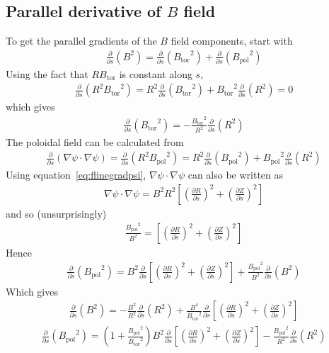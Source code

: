 \documentclass[12pt]{article}
\newcommand{\deriv}[2]{\ensuremath{\frac{\partial #1}{\partial #2}}}
\newcommand{\Bp}{\ensuremath{B_{\text{pol}}}}
\newcommand{\Bt}{\ensuremath{B_{\text{tor}}}}
\begin{document}
\subsection{Parallel derivative of $B$ field}
To get the parallel gradients of the $B$ field components, start with
%
\begin{align*}
\deriv{}{s}\left(B^2\right) = \deriv{}{s}\left(\Bt^2\right) +
\deriv{}{s}\left(\Bp^2\right)
\end{align*}
%
Using the fact that $R\Bt$ is constant along $s$,
%
\begin{align*}
\deriv{}{s}\left(R^2\Bt^2\right) = R^2\deriv{}{s}\left(\Bt^2\right) +
\Bt^2\deriv{}{s}\left(R^2\right) = 0
\end{align*}
%
which gives
%
\begin{align*}
  \deriv{}{s}\left(\Bt^2\right) = -\frac{\Bt^2}{R^2}\deriv{}{s}\left(R^2\right)
\end{align*}
%
The poloidal field can be calculated from
%
\begin{align*}
\deriv{}{s}\left(\nabla\psi \cdot \nabla\psi\right) =
\deriv{}{s}\left(R^2\Bp^2\right) = R^2\deriv{}{s}\left(\Bp^2\right) +
\Bp^2\deriv{}{s}\left(R^2\right)
\end{align*}
%
Using equation~\ref{eq:flinegradpsi}, $\nabla\psi \cdot \nabla\psi$ can also be
written as
%
\begin{align*}
\nabla\psi \cdot \nabla\psi = B^2R^2\left[\left(\deriv{R}{s}\right)^2 +
\left(\deriv{Z}{s}\right)^2\right]
\end{align*}
%
and so (unsurprisingly)
%
\begin{align*}
\frac{\Bp^2}{B^2} = \left[\left(\deriv{R}{s}\right)^2 +
\left(\deriv{Z}{s}\right)^2\right]
\end{align*}
%
Hence
%
\begin{align*}
\deriv{}{s}\left(\Bp^2\right) = B^2\deriv{}{s}\left[\left(\deriv{R}{s}\right)^2
+ \left(\deriv{Z}{s}\right)^2\right] +
\frac{\Bp^2}{B^2}\deriv{}{s}\left(B^2\right)
\end{align*}
%
Which gives
%
\begin{align*}
\deriv{}{s}\left(B^2\right) = -\frac{B^2}{R^2}\deriv{}{s}\left(R^2\right) +
\frac{B^4}{\Bt^2}\deriv{}{s}\left[\left(\deriv{R}{s}\right)^2 +
\left(\deriv{Z}{s}\right)^2\right]
\end{align*}
%
%
\begin{align*}
\deriv{}{s}\left(\Bp^2\right) = \left(1 +
\frac{\Bp^2}{\Bt^2}\right)B^2\deriv{}{s}\left[\left(\deriv{R}{s}\right)^2 +
\left(\deriv{Z}{s}\right)^2\right] -
\frac{\Bp^2}{R^2}\deriv{}{s}\left(R^2\right)
\end{align*}
\end{document}

